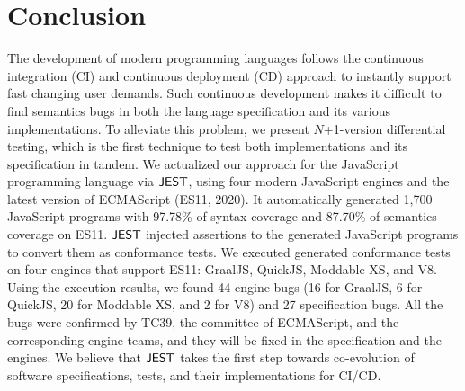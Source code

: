 \section{Conclusion}\label{sec:conclude}
The development of modern programming languages follows the continuous integration (CI) and
continuous deployment (CD) approach to instantly support fast changing user demands.
Such continuous development makes it difficult to find semantics bugs
in both the language specification and its various implementations.
To alleviate this problem, we present $N$+1-version differential testing,
which is the first technique to test both implementations and its specification in tandem.
We actualized our approach for the JavaScript programming language via $\tool$,
using four modern JavaScript engines and the latest version of ECMAScript (ES11, 2020).
It automatically generated 1,700 JavaScript programs with 97.78\% of syntax
coverage and 87.70\% of semantics coverage on ES11.  $\tool$ injected assertions
to the generated JavaScript programs to convert them as conformance tests.
We executed generated conformance tests on four engines that support ES11:
GraalJS, QuickJS, Moddable XS, and V8.  Using the execution results,
we found 44 engine bugs (16 for GraalJS, 6 for QuickJS,
20 for Moddable XS, and 2 for V8) and 27 specification bugs.
All the bugs were confirmed by TC39, the committee of ECMAScript, and
the corresponding engine teams, and they will be fixed in the specification and the engines.
We believe that $\tool$ takes the first step towards co-evolution of
software specifications, tests, and their implementations for CI/CD.
